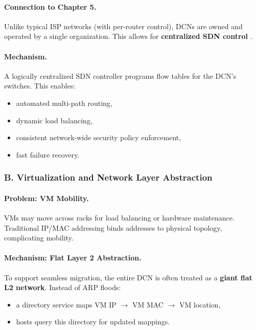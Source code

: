 \documentclass[12pt]{article}
\begin{document}
\paragraph*{Connection to Chapter 5.}
Unlike typical ISP networks (with per-router control), DCNs are owned and operated by a single organization. This allows for \textbf{centralized SDN control} \cite{13779,13778}.

\paragraph*{Mechanism.}
A logically centralized SDN controller programs flow tables for the DCN’s switches. This enables:
\begin{itemize}
    \item automated multi-path routing,
    \item dynamic load balancing,
    \item consistent network-wide security policy enforcement,
    \item fast failure recovery.
\end{itemize}


\subsubsection{B. Virtualization and Network Layer Abstraction}

\paragraph*{Problem: VM Mobility.}
VMs may move across racks for load balancing or hardware maintenance. Traditional IP/MAC addressing binds addresses to physical topology, complicating mobility.

\paragraph*{Mechanism: Flat Layer 2 Abstraction.}
To support seamless migration, the entire DCN is often treated as a \textbf{giant flat L2 network}. Instead of ARP floods:
\begin{itemize}
    \item a directory service maps VM IP $\rightarrow$ VM MAC $\rightarrow$ VM location,
    \item hosts query this directory for updated mappings.
\end{itemize}
\end{document}
